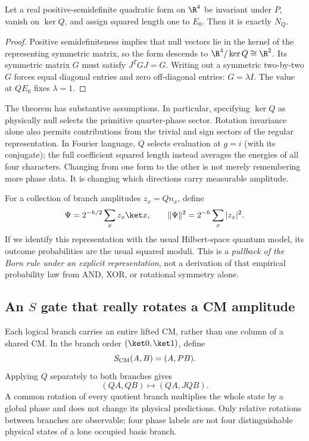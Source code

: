 \begin{proposition}
Let a real positive-semidefinite quadratic form on $\R^4$ be invariant under $P$, vanish on $\ker Q$, and assign squared length one to $E_0$. Then it is exactly $N_Q$.
\end{proposition}
\begin{proof}
Positive semidefiniteness implies that null vectors lie in the kernel of the representing symmetric matrix, so the form descends to $\R^4/\ker Q\cong\R^2$. Its symmetric matrix $G$ must satisfy $J^TGJ=G$. Writing out a symmetric two-by-two $G$ forces equal diagonal entries and zero off-diagonal entries: $G=\lambda I$. The value at $QE_0$ fixes $\lambda=1$.
\end{proof}
The theorem has substantive assumptions. In particular, specifying $\ker Q$ as physically null selects the primitive quarter-phase sector. Rotation invariance alone also permits contributions from the trivial and sign sectors of the regular representation. In Fourier language, $Q$ selects evaluation at $g=i$ (with its conjugate); the full coefficient squared length instead averages the energies of all four characters. Changing from one form to the other is not merely remembering more phase data. It is changing which directions carry measurable amplitude.

For a collection of branch amplitudes $z_x=Qn_x$, define
\begin{equation}\label{eq:stateC4}
 \Psi=2^{-h/2}\sum_x z_x\ket x,\qquad
 \|\Psi\|^2=2^{-h}\sum_x|z_x|^2.
\end{equation}
If we identify this representation with the usual Hilbert-space quantum model, its outcome probabilities are the usual squared moduli. This is a \emph{pullback of the Born rule under an explicit representation}, not a derivation of that empirical probability law from AND, XOR, or rotational symmetry alone.

\subsection{An \texorpdfstring{$S$}{S} gate that really rotates a CM amplitude}
Each logical branch carries an entire lifted CM, rather than one column of a shared CM. In the branch order $(\ket0,\ket1)$, define
\begin{equation}
 S_{\rm CM}(A,B)=(A,PB).
\end{equation}
Applying $Q$ separately to both branches gives
\begin{equation}
 (QA,QB)\longmapsto(QA,JQB).
\end{equation}
A common rotation of every quotient branch multiplies the whole state by a global phase and does not change its physical predictions. Only relative rotations between branches are observable; four phase labels are not four distinguishable physical states of a lone occupied basis branch.

